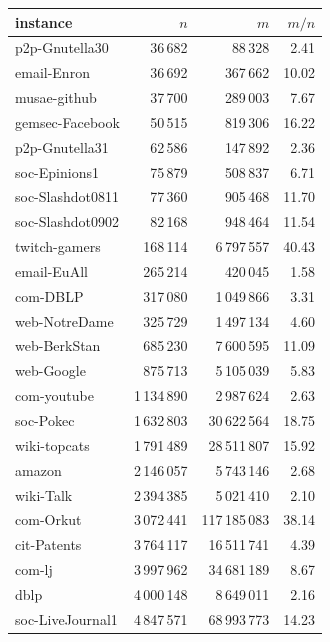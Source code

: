 \begin{tabular}{lrrr}
\toprule
instance & $n$ & $m$ & $m/n$ \\
\midrule
p2p-Gnutella30 & 36\,682 & 88\,328 & 2.41 \\
email-Enron & 36\,692 & 367\,662 & 10.02 \\
musae-github & 37\,700 & 289\,003 & 7.67 \\
gemsec-Facebook & 50\,515 & 819\,306 & 16.22 \\
p2p-Gnutella31 & 62\,586 & 147\,892 & 2.36 \\
soc-Epinions1 & 75\,879 & 508\,837 & 6.71 \\
soc-Slashdot0811 & 77\,360 & 905\,468 & 11.70 \\
soc-Slashdot0902 & 82\,168 & 948\,464 & 11.54 \\
twitch-gamers & 168\,114 & 6\,797\,557 & 40.43 \\
email-EuAll & 265\,214 & 420\,045 & 1.58 \\
com-DBLP & 317\,080 & 1\,049\,866 & 3.31 \\
web-NotreDame & 325\,729 & 1\,497\,134 & 4.60 \\
web-BerkStan & 685\,230 & 7\,600\,595 & 11.09 \\
web-Google & 875\,713 & 5\,105\,039 & 5.83 \\
com-youtube & 1\,134\,890 & 2\,987\,624 & 2.63 \\
soc-Pokec & 1\,632\,803 & 30\,622\,564 & 18.75 \\
wiki-topcats & 1\,791\,489 & 28\,511\,807 & 15.92 \\
amazon & 2\,146\,057 & 5\,743\,146 & 2.68 \\
wiki-Talk & 2\,394\,385 & 5\,021\,410 & 2.10 \\
com-Orkut & 3\,072\,441 & 117\,185\,083 & 38.14 \\
cit-Patents & 3\,764\,117 & 16\,511\,741 & 4.39 \\
com-lj & 3\,997\,962 & 34\,681\,189 & 8.67 \\
dblp & 4\,000\,148 & 8\,649\,011 & 2.16 \\
soc-LiveJournal1 & 4\,847\,571 & 68\,993\,773 & 14.23 \\
\bottomrule
\end{tabular}
